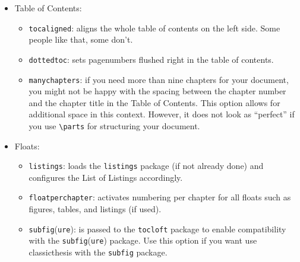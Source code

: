 \begin{itemize}
\begin{itemize}
\item\texttt{pdfspacing}: makes use of pdftex' letter spacing capabilities via the \texttt{microtype} package.\footnote{Use \texttt{microtype}'s \texttt{DVIoutput} option to generate DVI with pdftex.} This fixes some serious issues regarding math formul\ae\ etc. (\eg, ``\ss'') in headers. 

\item\texttt{minionprospacing}: uses the internal \texttt{textssc} command of the \texttt{MinionPro} package for letter spacing. This automatically enables the \texttt{minionpro} option and overrides the \texttt{pdfspacing} option.
\end{itemize}  

\item Table of Contents:
\begin{itemize}
\item\texttt{tocaligned}: aligns the whole table of contents on the left side. Some people like that, some don't.

\item\texttt{dottedtoc}: sets pagenumbers flushed right in the table of contents.

\item\texttt{manychapters}: if you need more than nine chapters for your document, you might not be happy with the spacing between the chapter number and the chapter title in the Table of Contents. This option allows for additional space in this context. However, it does not look as ``perfect'' if you use \verb|\parts| for structuring your document.
\end{itemize}

\item Floats:
\begin{itemize}
\item\texttt{listings}: loads the \texttt{listings} package (if not already done) and configures the List of Listings accordingly.
    
\item\texttt{floatperchapter}: activates numbering per chapter for all floats such as figures, tables, and listings (if used).	
    
\item\texttt{subfig}(\texttt{ure}): is passed to the \texttt{tocloft} package to enable compatibility with the \texttt{subfig}(\texttt{ure}) package. Use this option if you want use classicthesis with the \texttt{subfig} package.

\end{itemize}    

\end{itemize}

